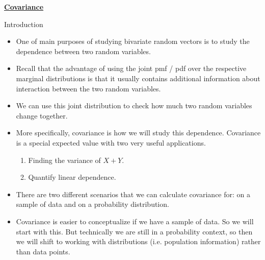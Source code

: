 \documentclass{article}
\newcommand{\bu}[1]{\textbf{\ul{#1}}}				%
\begin{document}
\bu{Covariance}\bigskip
 
Introduction\bigskip
\begin{itemize}
    \item One of main purposes of studying bivariate random vectors is to study the dependence between two random variables.
    \item[] Recall that the advantage of using the joint pmf / pdf over the respective marginal distributions is that it usually contains additional information about interaction between the two random variables.
    \item[] We can use this joint distribution to check how much two random variables change together.\bigskip
    \item More specifically, covariance is how we will study this dependence. Covariance is a special expected value with two very useful applications.
    \begin{enumerate}
        \item Finding the variance of $X + Y$.\vspace{30pt}
        \item Quantify linear dependence.
    \end{enumerate}\bigskip
    \item There are two different scenarios that we can calculate covariance for: on a sample of data and on a probability distribution.
    \item[] Covariance is easier to conceptualize if we have a sample of data. So we will start with this. But technically we are still in a probability context, so then we will shift to working with distributions (i.e. population information) rather than data points.
\end{itemize}\bigskip

\newpage%
\end{document}
